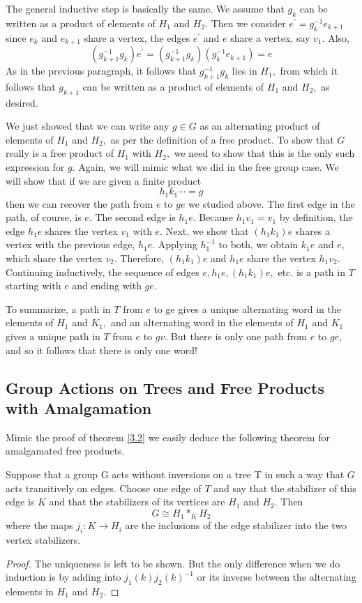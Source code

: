 \par
The general inductive step is basically the same. We assume that $g_{k}$ can be written as a product of elements of $H_{1}$ and $H_{2}$. Then we consider $e^{\prime}=g_{k}^{-1} e_{k+1}$ since $e_{k}$ and $e_{k+1}$ share a vertex, the edges $e^{\prime}$ and $e$ share a vertex, say $v_{1} .$ Also,
\[
\left(g_{k+1}^{-1} g_{k}\right) e^{\prime}=\left(g_{k+1}^{-1} g_{k}\right)\left(g_{k}^{-1} e_{k+1}\right)=e
\]
As in the previous paragraph, it follows that $g_{k+1}^{-1} g_{k}$ lies in $H_{1},$ from which it follows that $g_{k+1}$ can be written as a product of elements of $H_{1}$ and $H_{2},$ as desired. 
\par
We just showed that we can write any $g \in G$ as an alternating product of elements of $H_{1}$ and $H_{2},$ as per the definition of a free product. To show that $G$ really is a free product of $H_{1}$ with $H_{2},$ we need to show that this is the only such expression for $g .$ Again, we will mimic what we did in the free group case. We will show that if we are given a finite product
\[
h_{1} k_{1} \cdots=g
\]
then we can recover the path from $e$ to $g e$ we studied above. The first edge in the path, of course, is $e .$ The second edge is $h_{1} e .$ Because $h_{1} v_{1}=v_{1}$ by definition, the edge $h_{1} e$ shares the vertex $v_{1}$ with $e .$ Next, we show that $\left(h_{1} k_{1}\right) e$ shares a vertex with the previous edge, $h_{1} e .$ Applying $h_{1}^{-1}$ to both, we obtain $k_{1} e$ and $e,$ which share the vertex $v_{2}$. Therefore, $\left(h_{1} k_{1}\right) e$ and $h_{1} e$ share the vertex $h_{1} v_{2}$. Continuing inductively, the sequence of edges $e, h_{1} e,\left(h_{1} k_{1}\right) e,$ etc. is a path in $T$ starting with $e$ and ending with $g e$.
\par
To summarize, a path in $T$ from $e$ to ge gives a unique alternating word in the elements of $H_{1}$ and $K_{1},$ and an alternating word in the elements of $H_{1}$ and $K_{1}$ gives a unique path in $T$ from $e$ to $g v .$ But there is only one path from $e$ to $g e,$ and so it follows that there is only one word!

\subsection{Group Actions on Trees and Free Products with Amalgamation}
Mimic the proof of theorem \ref{3.2} we easily deduce the following theorem for amalgamated free products.
\begin{theorem}
\label{thm3.3}
Suppose that a group G acts without inversions on a tree T in such a way that $G$ acts transitively on edges. Choose one edge of $T$ and say that the stabilizer of this edge is $K$ and that the stabilizers of its vertices are $H_{1}$ and $H_{2}$. Then
\[
G \cong H_{1} *_{K} H_{2}
\]
where the maps $j_i:K \rightarrow H_{i}$ are the inclusions of the edge stabilizer into the two vertex
stabilizers.
\end{theorem}
\begin{proof}
The uniqueness is left to be shown. But the only difference when we do induction is by adding into $j_1(k)j_2(k)^{-1}$ or its inverse between the alternating elements in $H_1$ and $H_2$.
\end{proof}


